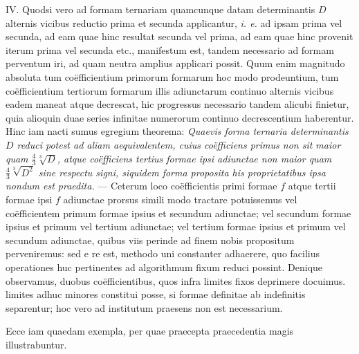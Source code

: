 IV. Quodsi vero ad formam ternariam quamcunque datam determinantis \(D\) alternis vicibus reductio prima et secunda applicantur, \emph{i. e.} ad ipsam prima vel secunda, ad eam quae hinc resultat secunda vel prima, ad eam quae hinc provenit iterum prima vel secunda etc., manifestum est, tandem necessario ad formam perventum iri, ad quam neutra amplius applicari possit. Quum enim magnitudo absoluta tum co\"efficientium primorum formarum hoc modo prodeuntium, tum co\"efficientium tertiorum formarum illis adiunctarum continuo alternis vicibus eadem maneat atque decrescat, hic progressus necessario tandem alicubi finietur, quia alioquin duae series infinitae numerorum continuo decrescentium haberentur. Hinc iam nacti sumus egregium theorema: \emph{Quaevis forma ternaria determinantis \(D\) reduci potest ad aliam aequivalentem, cuius co\"efficiens primus non sit maior quam \(\frac{4}{3}\sqrt[3]{D}\), atque co\"efficiens tertius formae ipsi adiunctae non maior quam \(\frac{4}{3}\sqrt[3]{D^2}\) sine respectu signi, siquidem forma proposita his proprietatibus ipsa nondum est praedita.} --- Ceterum loco co\"efficientis primi formae \(f\) atque tertii formae ipsi \(f\) adiunctae prorsus simili modo tractare potuissemus vel co\"efficientem primum formae ipsius et secundum adiunctae; vel secundum formae ipsius et primum vel tertium adiunctae; vel tertium formae ipsius et primum vel secundum adiunctae, quibus viis perinde ad finem nobis propositum perveniremus: sed e re est, methodo uni constanter adhaerere, quo facilius operationes huc pertinentes ad algorithmum fixum reduci possint. Denique observamus, duobus co\"efficientibus, quos infra limites fixos deprimere docuimus. limites adhuc minores constitui posse, si formae definitae ab indefinitis separentur; hoc vero ad institutum praesens non est necessarium.

Ecce iam quaedam exempla, per quae praecepta praecedentia magis illustrabuntur.

